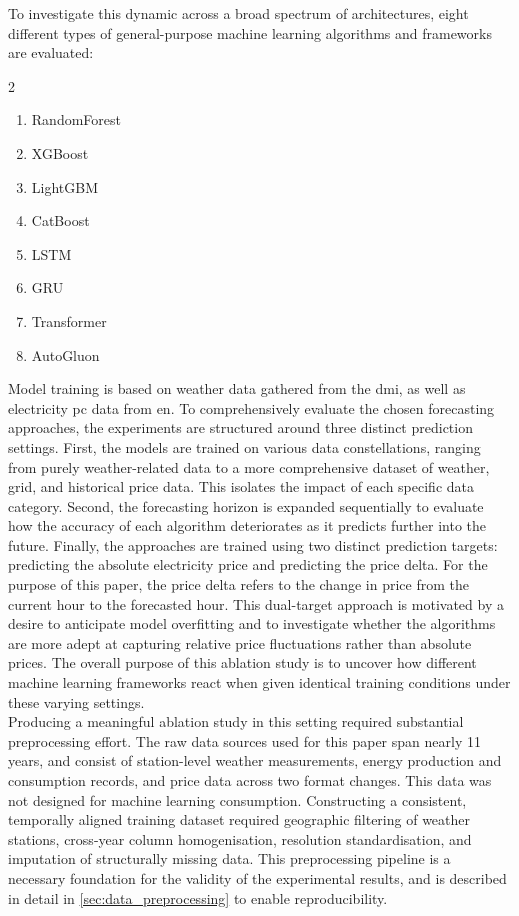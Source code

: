 To investigate this dynamic across a broad spectrum of architectures, eight 
different types of general-purpose machine learning algorithms and frameworks 
are evaluated: 
\begin{multicols}{2}
	\begin{enumerate}
		\item RandomForest\cite{randomForestRegressor}
		\item XGBoost\cite{xgboost}
		\item LightGBM\cite{lightgbm}
		\item CatBoost\cite{catboost}
		\item LSTM\cite{lstm}
		\item GRU\cite{gru}
		\item Transformer\cite{transformer}
		\item AutoGluon\cite{autogluon}
	\end{enumerate}
\end{multicols}
Model training is based on weather data gathered from the 
\gls{dmi}, as well as electricity \gls{pc} data from \gls{en}. To 
comprehensively evaluate the chosen forecasting approaches, the experiments are 
structured around three distinct prediction settings. First, the models are 
trained on various data constellations, ranging from purely weather-related 
data to a more comprehensive dataset of weather, grid, and historical price 
data. This isolates the impact of each specific data category. Second, the 
forecasting horizon is expanded sequentially to evaluate how the accuracy of 
each algorithm deteriorates as it predicts further into the future. Finally, 
the approaches are trained using two distinct prediction targets: predicting 
the absolute electricity price and predicting the price delta. For the purpose 
of this paper, the price delta refers to the change in price from the current 
hour to the forecasted hour. This dual-target approach is motivated by a desire 
to anticipate model overfitting and to investigate whether the algorithms are 
more adept at capturing relative price fluctuations rather than absolute 
prices. The overall purpose of this ablation study is to uncover how different 
machine learning frameworks react when given identical training conditions 
under these varying settings.\\

Producing a meaningful ablation study in this setting required substantial 
preprocessing effort. The raw data sources used for this paper span nearly 11 
years, and consist of 
station-level weather measurements, energy production and consumption records, 
and price data across two format changes. This data was not designed for 
machine learning consumption. Constructing a consistent, temporally aligned 
training dataset required geographic filtering of weather stations, cross-year 
column homogenisation, resolution standardisation, and imputation of 
structurally missing data. This preprocessing pipeline is a necessary 
foundation for the validity of the experimental results, and is described in 
detail in \autoref{sec:data_preprocessing} to enable reproducibility.\\

